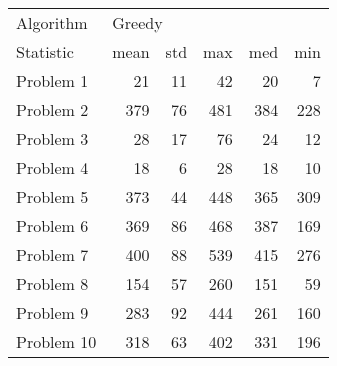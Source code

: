 \begin{tabular}{lrrrrr}
\toprule
Algorithm & \multicolumn{5}{l}{Greedy} \\
Statistic &   mean & std &  max &  med &  min \\
\midrule
Problem 1  &     21 &  11 &   42 &   20 &    7 \\
Problem 2  &    379 &  76 &  481 &  384 &  228 \\
Problem 3  &     28 &  17 &   76 &   24 &   12 \\
Problem 4  &     18 &   6 &   28 &   18 &   10 \\
Problem 5  &    373 &  44 &  448 &  365 &  309 \\
Problem 6  &    369 &  86 &  468 &  387 &  169 \\
Problem 7  &    400 &  88 &  539 &  415 &  276 \\
Problem 8  &    154 &  57 &  260 &  151 &   59 \\
Problem 9  &    283 &  92 &  444 &  261 &  160 \\
Problem 10 &    318 &  63 &  402 &  331 &  196 \\
\bottomrule
\end{tabular}
